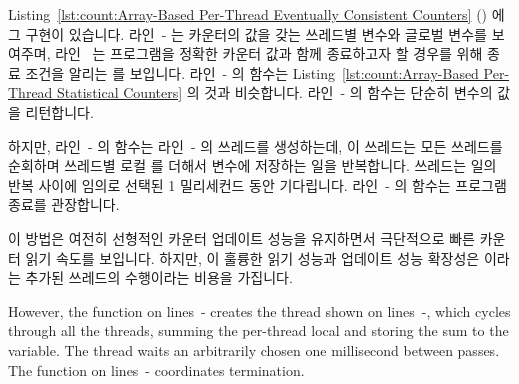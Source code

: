\begin{lineref}
\begin{lineref}
Listing~\ref{lst:count:Array-Based Per-Thread Eventually Consistent Counters}
() 에 그 구현이 있습니다.
라인~- 는 카운터의 값을 갖는 쓰레드별 변수와
글로벌 변수를 보여주며, 라인~ 는 프로그램을 정확한 카운터 값과
함께 종료하고자 할 경우를 위해 종료 조건을 알리는  를 보입니다.
라인~- 의  함수는
Listing~\ref{lst:count:Array-Based Per-Thread Statistical Counters} 의 것과
비슷합니다.
라인~- 의  함수는 단순히
 변수의 값을 리턴합니다.

하지만, 라인~- 의  함수는
라인~- 의  쓰레드를
생성하는데, 이 쓰레드는 모든 쓰레드를 순회하며 쓰레드별 로컬  를
더해서  변수에 저장하는 일을 반복합니다.
 쓰레드는 일의 반복 사이에 임의로 선택된 1 밀리세컨드 동안
기다립니다.
라인~- 의  함수는
프로그램 종료를 관장합니다.

이 방법은 여전히 선형적인 카운터 업데이트 성능을 유지하면서 극단적으로 빠른
카운터 읽기 속도를 보입니다.
하지만, 이 훌륭한 읽기 성능과 업데이트 성능 확장성은  이라는
추가된 쓰레드의 수행이라는 비용을 가집니다.
\iffalse

However, the  function on
lines~-
creates the  thread shown on
lines~-, which
cycles through all the threads,
summing the per-thread local  and storing the
sum to the  variable.
The  thread waits an arbitrarily chosen one millisecond
between passes.
The  function on
lines~- coordinates termination.


\end{lineref}
\end{lineref}

